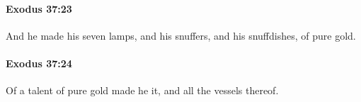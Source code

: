 		\paragraph{Exodus 37:23} %
			\label{EXODUS-37-23}

			And he made his seven lamps, and his snuffers, and his snuffdishes, of pure gold.


		\paragraph{Exodus 37:24} %
			\label{EXODUS-37-24}

			Of a talent of pure gold made he it, and all the vessels thereof.


